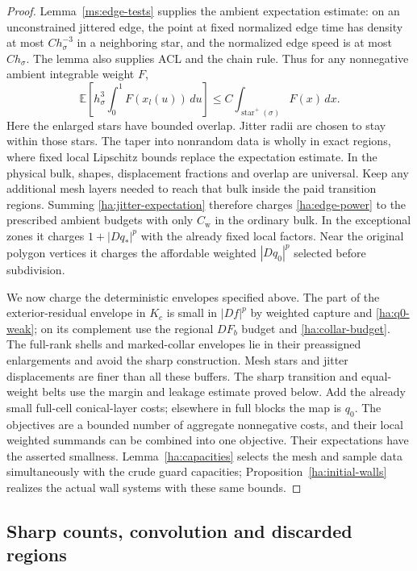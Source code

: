 \documentclass[11pt]{article}
\numberwithin{equation}{section}
\theoremstyle{definition}
\theoremstyle{remark}
\begin{document}
\begin{proof}
Lemma~\ref{ms:edge-tests} supplies the ambient expectation estimate:
on an unconstrained jittered edge, the point at fixed normalized
edge time has density at most $C h_\sigma^{-3}$ in a neighboring
star, and the normalized edge speed is at most $C h_\sigma$.
The lemma also supplies ACL and the chain rule.  Thus for any
nonnegative ambient integrable weight $F$,
\begin{equation}\label{ha:jitter-expectation}
 \mathbb E\left[h_\sigma^3\int_0^1F(x_l(u))\,du\right]
       \le C\int_{\operatorname{star}^+(\sigma)}F(x)\,dx.
\end{equation}
Here the enlarged stars have bounded overlap.  Jitter radii are
chosen to stay within those stars.  The taper into nonrandom data is
wholly in exact regions, where fixed local Lipschitz bounds replace
the expectation estimate.  In the physical bulk, shapes, displacement
fractions and overlap are universal.  Keep any additional mesh layers
needed to reach that bulk inside the paid transition regions.
Summing \eqref{ha:jitter-expectation} therefore charges
\eqref{ha:edge-power} to the prescribed ambient budgets with only
$C_{\mathrm w}$ in the ordinary bulk.  In the exceptional zones it
charges $1+|Dq_*|^p$ with the already fixed local factors.  Near the
original polygon vertices it charges the affordable weighted
$|Dq_0|^p$ selected before subdivision.

We now charge the deterministic envelopes specified above.  The
part of the exterior-residual envelope in $K_c$ is small in
$|Df|^p$ by weighted capture and \eqref{ha:q0-weak}; on its complement
use the regional $DF_b$ budget and \eqref{ha:collar-budget}.  The
full-rank shells and marked-collar envelopes lie in their preassigned
enlargements and avoid the sharp construction.  Mesh stars and
jitter displacements are finer than all these buffers.  The sharp
transition and equal-weight belts use the margin and leakage estimate
proved below.  Add the already small full-cell conical-layer costs;
elsewhere in full blocks the map is $q_0$.  The objectives are a
bounded number of aggregate nonnegative costs, and their local
weighted summands can be combined into one objective.  Their
expectations have the asserted smallness.  Lemma~\ref{ha:capacities}
selects the mesh and sample data simultaneously with the crude guard
capacities; Proposition~\ref{ha:initial-walls} realizes the actual
wall systems with these same bounds.
\end{proof}

\subsection{Sharp counts, convolution and discarded regions}
\label{ha:sharp-errors}
\end{document}
